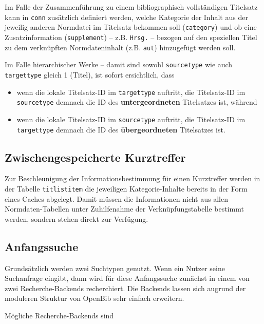 \documentclass[11pt, twoside, a4paper, BCOR8mm, DIV12, bibtotoc,idxtotoc]{scrbook}
\begin{document}
Im Falle der Zusammenführung zu einem bibliographisch vollständigen
Titelsatz kann in \texttt{conn} zusätzlich definiert werden,
welche Kategorie der Inhalt aus der jeweilig anderen Normdatei im
Titelsatz bekommen soll (\texttt{category}) und ob eine
Zusatzinformation (\texttt{supplement}) -- z.B. \texttt{Hrsg.} --
bezogen auf den speziellen Titel zu dem verknüpften Normdateninhalt
(z.B.  \texttt{aut}) hinzugefügt werden soll.

Im Falle hierarchischer Werke -- damit sind sowohl \texttt{sourcetype}
wie auch \texttt{targettype} gleich 1 (Titel), ist sofort ersichtlich,
dass

\begin{itemize}
\item wenn die lokale Titelsatz-ID im \texttt{targettype} auftritt,
  die Titelsatz-ID im \texttt{sourcetype} demnach die ID des
  \textbf{untergeordneten} Titelsatzes ist, während
\item wenn die lokale Titelsatz-ID im \texttt{sourcetype} auftritt,
  die Titelsatz-ID im \texttt{targettype} demnach die ID des
  \textbf{übergeordneten} Titelsatzes ist.
\end{itemize}


\subsection{Zwischengespeicherte Kurztreffer}

Zur Beschleunigung der Informationsbestimmung für einen Kurztreffer
werden in der Tabelle \texttt{titlistitem} die jeweiligen
Kategorie-Inhalte bereits in der Form eines Caches abgelegt. Damit
müssen die Informationen nicht aus allen Normdaten-Tabellen unter
Zuhilfenahme der Ver\-knüp\-fungs\-tabelle bestimmt werden, sondern stehen
direkt zur Verfügung.

\subsection{Anfangssuche}


Grundsätzlich werden zwei Suchtypen genutzt. Wenn ein Nutzer seine
Suchanfrage eingibt, dann wird für diese Anfangssuche zunächst in
einem von zwei Recherche-Backends recherchiert. Die Backends lassen sich
augrund der moduleren Struktur von OpenBib sehr einfach erweitern.

Mögliche Recherche-Backends sind 
\end{document}
